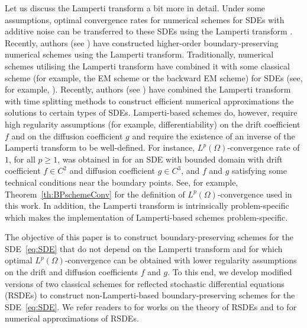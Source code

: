 \documentclass[11pt]{amsart}
\begin{document}
{Let us discuss the Lamperti transform a bit more in detail. Under some assumptions, optimal convergence rates for numerical schemes for SDEs with additive noise can be transferred to these SDEs using the Lamperti transform \cite{MR4220738,MR4737060}. Recently, authors (see \cite{MR4888024,MR4597411}) have constructed higher-order boundary-preserving numerical schemes using the Lamperti transform. Traditionally, numerical schemes utilising the Lamperti transform have combined it with some classical scheme (for example, the EM scheme or the backward EM scheme) for SDEs (see, for example, \cite{MR3006996,MR3248050,MR4274899}). Recently, authors (see \cite{MR4544037,MR4737060}) have combined the Lamperti transform with time splitting methods to construct efficient numerical approximations the solutions to certain types of SDEs. Lamperti-based schemes do, however, require high regularity assumptions (for example, differentiability) on the drift coefficient $f$ and on the diffusion coefficient $g$ and require the existence of an inverse of the Lamperti transform to be well-defined. For instance, $L^{p}(\Omega)$-convergence rate of $1$, for all $p \geq 1$, was obtained in \cite{MR4737060} for an SDE with bounded domain with drift coefficient $f \in C^{2}$ and diffusion coefficient $g \in C^{3}$, and $f$ and $g$ satisfying some technical conditions near the boundary points. See, for example, Theorem~\ref{th:BPschemeConv} for the definition of $L^{p}(\Omega)$-convergence used in this work. In addition, the Lamperti transform is intrinsically problem-specific which makes the implementation of Lamperti-based schemes problem-specific.

The objective of this paper is to construct boundary-preserving schemes for the SDE~\eqref{eq:SDE} that do not depend on the Lamperti transform and for which optimal $L^{p}(\Omega)$-convergence can be obtained with lower regularity assumptions on the drift and diffusion coefficients $f$ and $g$. To this end, we develop modified versions of two classical schemes for reflected stochastic differential equations (RSDEs) to construct non-Lamperti-based boundary-preserving schemes for the SDE~\eqref{eq:SDE}. We refer readers to \cite{Chitashvili,Pilipenko2014AnIT,MR873889,MR4521003,MR529332} for works on the theory of RSDEs and to \cite{MR2416011,MR1341164,MR2689982,MR1341162,MR1357657,MR1840835,SLOMINSKI1994197} for numerical approximations of RSDEs.

}
\end{document}

